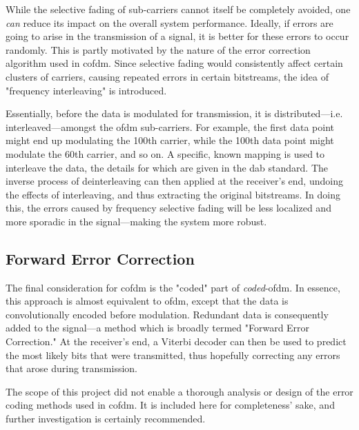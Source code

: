 \documentclass[class=report,11pt,crop=false]{standalone}
\begin{document}
While the selective fading of sub-carriers cannot itself be completely avoided, one \emph{can} reduce its impact on the overall system performance. Ideally, if errors are going to arise in the transmission of a signal, it is better for these errors to occur randomly. This is partly motivated by the nature of the error correction algorithm used in \gls{cofdm}. Since selective fading would consistently affect certain clusters of carriers, causing repeated errors in certain bitstreams, the idea of "frequency interleaving" is introduced.

Essentially, before the data is modulated for transmission, it is distributed---i.e. interleaved---amongst the \gls{ofdm} sub-carriers. For example, the first data point might end up modulating the 100th carrier, while the 100th data point might modulate the 60th carrier, and so on. A specific, known mapping is used to interleave the data, the details for which are given in the \gls{dab} standard. The inverse process of deinterleaving can then applied at the receiver's end, undoing the effects of interleaving, and thus extracting the original bitstreams. In doing this, the errors caused by frequency selective fading will be less localized and more sporadic in the signal---making the system more robust.

\subsection{Forward Error Correction}
The final consideration for \gls{cofdm} is the "coded" part of \emph{coded}-\gls{ofdm}. In essence, this approach is almost equivalent to \gls{ofdm}, except that the data is convolutionally encoded before modulation. Redundant data is consequently added to the signal---a method which is broadly termed "Forward Error Correction." At the receiver's end, a Viterbi decoder can then be used to predict the most likely bits that were transmitted, thus hopefully correcting any errors that arose during transmission.

The scope of this project did not enable a thorough analysis or design of the error coding methods used in \gls{cofdm}. It is included here for completeness' sake, and further investigation is certainly recommended.

\end{document}

